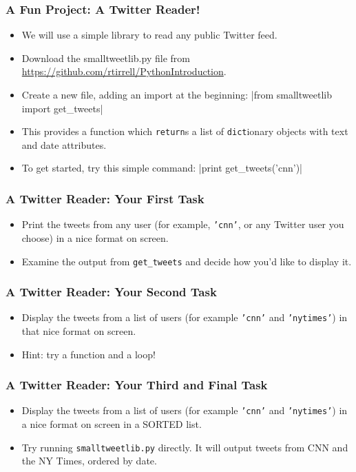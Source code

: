 \documentclass[10pt]{beamer}
\begin{document}
\begin{frame}
  \frametitle{A Fun Project: A Twitter Reader!}
  \begin{itemize}
    \item We will use a simple library to read any public Twitter feed.
    \item Download the smalltweetlib.py file from \href{https://github.com/rtirrell/PythonIntroduction}{https://github.com/rtirrell/PythonIntroduction}.
    \item Create a new file, adding an import at the beginning: 
      |from smalltweetlib import get_tweets|
    \item This provides a function which \texttt{return}s a list of \texttt{dict}ionary objects with text and date attributes.
    \item To get started, try this simple command: 
      |print get_tweets('cnn')|
  \end{itemize}
\end{frame}

\begin{frame}
  \frametitle{A Twitter Reader: Your First Task}
  \begin{itemize}
    \item Print the tweets from any user (for example, \texttt{'cnn'}, or any Twitter user you choose) in a nice format on screen.
    \item Examine the output from \texttt{get\_tweets} and decide how you'd like to display it.
  \end{itemize}
\end{frame}

\begin{frame}
  \frametitle{A Twitter Reader: Your Second Task}
  \begin{itemize}
    \item Display the tweets from a list of users (for example \texttt{'cnn'} and \texttt{'nytimes'}) in that nice format on screen.
    \item Hint: try a function and a loop!
  \end{itemize}
\end{frame}

\begin{frame}
  \frametitle{A Twitter Reader: Your Third and Final Task}
  \begin{itemize}
    \item Display the tweets from a list of users (for example \texttt{'cnn'} and \texttt{'nytimes'}) in a nice format on screen in a SORTED list.
    \item Try running \texttt{smalltweetlib.py} directly.
      It will output tweets from CNN and the NY Times, ordered by date.
  \end{itemize}
\end{frame}
\end{document}
